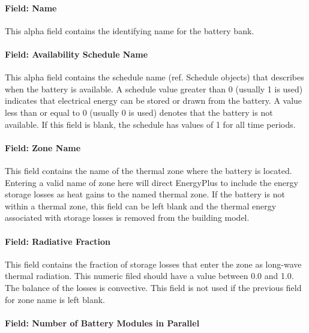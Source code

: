\paragraph{Field: Name}\label{field-name-7-004}

This alpha field contains the identifying name for the battery bank.

\paragraph{Field: Availability Schedule Name}\label{field-availability-schedule-name-6-000}

This alpha field contains the schedule name (ref. Schedule objects) that describes when the battery is available. A schedule value greater than 0 (usually 1 is used) indicates that electrical energy can be stored or drawn from the battery. A value less than or equal to 0 (usually 0 is used) denotes that the battery is not available. If this field is blank, the schedule has values of 1 for all time periods.

\paragraph{Field: Zone Name}\label{field-zone-name-6-000}

This field contains the name of the thermal zone where the battery is located. Entering a valid name of zone here will direct EnergyPlus to include the energy storage losses as heat gains to the named thermal zone. If the battery is not within a thermal zone, this field can be left blank and the thermal energy associated with storage losses is removed from the building model.

\paragraph{Field: Radiative Fraction}\label{field-radiative-fraction-4}

This field contains the fraction of storage losses that enter the zone as long-wave thermal radiation. This numeric filed should have a value between 0.0 and 1.0. The balance of the losses is convective. This field is not used if the previous field for zone name is left blank.

\paragraph{Field: Number of Battery Modules in Parallel}\label{field-number-of-battery-modules-in-parallel}


